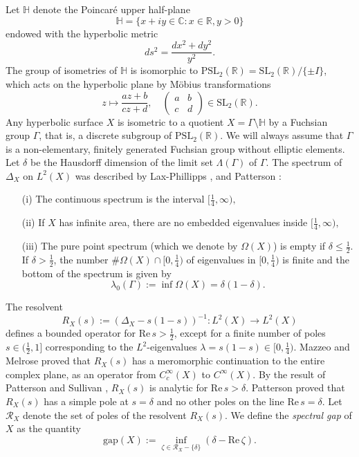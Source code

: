 \documentclass[12pt]{article}
\newcommand{\RR}{\mathbb{R}}
\newcommand{\PSL}{\mathrm{PSL}}
\newcommand{\R}{\mathrm{Re}\,}
\newcommand{\HH}{\mathbb{H}}
\begin{document}
Let $ \mathbb{H} $ denote the Poincaré upper half-plane
$$ \mathbb{H} = \{ x+iy \in \mathbb{C} :  x\in \mathbb{R}, y>0\} $$
endowed with the hyperbolic metric
$$ ds^{2} = \frac{dx^{2}+dy^{2}}{y^{2}}. $$
The group of isometries of $ \mathbb{H} $ is isomorphic to $ \mathrm{PSL}_{2}(\mathbb{R}) = \mathrm{SL}_{2}(\RR)/\{ \pm I\} $, which acts on the hyperbolic plane by Möbius transformations
$$ z\mapsto \frac{az +b}{cz+ d}, \quad \begin{pmatrix}
a & b \\
c & d 
\end{pmatrix} \in \mathrm{SL}_{2}(\mathbb{R}). $$
Any hyperbolic surface $ X $ is isometric to a quotient $ X=\Gamma\setminus \HH $ by a Fuchsian group $ \Gamma $, that is, a discrete subgroup of $ \PSL_{2}(\RR). $ We will always assume that $ \Gamma $ is a non-elementary, finitely generated Fuchsian group without elliptic elements. Let $ \delta $ be the Hausdorff dimension of the limit set $ \Lambda(\Gamma) $ of $ \Gamma $. The spectrum of $ \Delta_{X} $ on $ L^{2}(X) $ was described by Lax-Phillipps \cite{LaxPhil}, \cite{LaxPhillips} and Patterson \cite{Patt}:

\begin{enumerate}
\item[(i)] The continuous spectrum is the interval $ [\frac{1}{4}, \infty), $
\item[(ii)] If $ X $ has infinite area, there are no embedded eigenvalues inside $ [\frac{1}{4}, \infty), $
\item[(iii)] The pure point spectrum (which we denote by $ \Omega(X) $) is empty if $ \delta \leq \frac{1}{2} $. If $ \delta > \frac{1}{2} $, the number $ \# \Omega(X) \cap [0, \frac{1}{4}) $ of eigenvalues in $ [0, \frac{1}{4}) $ is finite and the bottom of the spectrum is given by
$$ \lambda_{0}(\Gamma) := \inf \Omega(X) = \delta(1-\delta). $$
\end{enumerate}
The resolvent 
$$ R_{X}(s) := (\Delta_{X}-s(1-s))^{-1} : L^{2}(X) \to L^{2}(X) $$
defines a bounded operator for $ \R s > \frac{1}{2} $, except for a finite number of poles $ s\in (\frac{1}{2}, 1] $ corresponding to the $ L^{2} $-eigenvalues $ \lambda = s(1-s)\in [0, \frac{1}{4}) $. Mazzeo and Melrose \cite{MazzeoMelrose} proved that $ R_{X}(s) $
has a meromorphic continuation to the entire complex plane, as an operator from $ C_{c}^{\infty}(X) $ to $ C^{\infty}(X) $. By the result of Patterson \cite{Patt} and Sullivan \cite{Sull}, $ R_{X}(s) $ is analytic for $ \R s > \delta $. Patterson \cite{Patt2} proved that $ R_{X}(s) $ has a simple pole at $ s=\delta $ and no other poles on the line $ \R s = \delta. $ Let $ \mathcal{R}_{X} $ denote the set of poles of the resolvent $ R_{X}(s) $. We define the \textit{spectral gap} of $ X $ as the quantity
$$ \mathrm{gap}(X):= \inf_{\zeta\in \mathcal{R}_{X}-\{ \delta \}} ( \delta-\mathrm{Re}\, \zeta). $$
\end{document}
